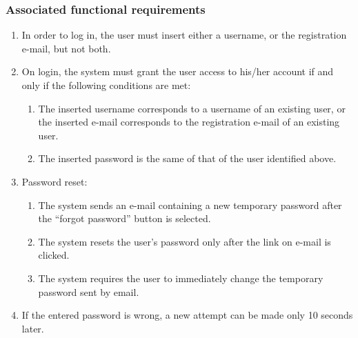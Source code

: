 \subsubsection{Associated functional requirements}
\begin{enumerate}
    \item In order to log in, the user must insert either a username, or the registration e-mail, but not both.
    \item On login, the system must grant the user access to his/her account if and only if the following conditions are met:
    \begin{enumerate}
    	\item The inserted username corresponds to a username of an existing user, or the inserted e-mail corresponds to the registration e-mail of an existing user.
	\item The inserted password is the same of that of the user identified above.
    \end{enumerate}
	\item Password reset:
	\begin{enumerate}
		\item The system sends an e-mail containing a new temporary password after the ``forgot password'' button is selected.
	    \item The system resets the user's password only after the link on e-mail is clicked.
		\item The system requires the user to immediately change the temporary password sent by email.
	\end{enumerate}
    \item If the entered password is wrong, a new attempt can be made only 10 seconds later.

\end{enumerate}
